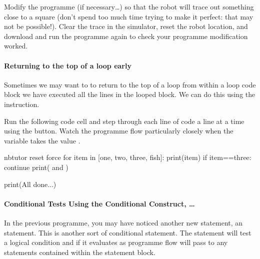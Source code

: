 \documentclass[letterpaper,10pt,english]{sphinxmanual}
\begin{document}
Modify the programme (if necessary…) so that the robot will trace out something close to a square (don’t spend too much time trying to make it perfect: that may not be possible!). Clear the trace in the simulator, reset the robot location, and download and run the programme again to check your programme modification worked.


\paragraph{Returning to the top of a loop early}
\label{\detokenize{content/02_Robot_Lab/Section_00_01:Returning-to-the-top-of-a-loop-early}}
Sometimes we may want to to return to the top of a loop from within a loop code block  we have executed all the lines in the looped block. We can do this using the  instruction.

Run the following code cell and step through each line of code a line at a time using the   button. Watch the programme flow particularly closely when the  variable takes the value .

{
\begin{sphinxVerbatim}[commandchars=\\\{\}]
\llap{\color{nbsphinxin}[ ]:\,\hspace{\fboxrule}\hspace{\fboxsep}}\PYGZpc{}\PYGZpc{}nbtutor \PYGZhy{}\PYGZhy{}reset \PYGZhy{}\PYGZhy{}force
for item in [\PYGZsq{}one\PYGZsq{}, \PYGZsq{}two\PYGZsq{}, \PYGZsq{}three\PYGZsq{}, \PYGZsq{}fish\PYGZsq{}]:
    print(item)
    if item==\PYGZsq{}three\PYGZsq{}:
        continue
    print(\PYGZsq{} and \PYGZsq{})

print(\PYGZsq{}All done...\PYGZsq{})
\end{sphinxVerbatim}
}


\paragraph{Conditional Tests Using the Conditional Construct, …}
\label{\detokenize{content/02_Robot_Lab/Section_00_01:Conditional-Tests-Using-the-Conditional-Construct,-if_u2026}}
In the previous programme, you may have noticed another new statement, an  statement. This is another sort of conditional statement. The  statement will test a logical condition and if it evaluates as  programme flow will pass to any statements contained within the  statement block.
\end{document}
